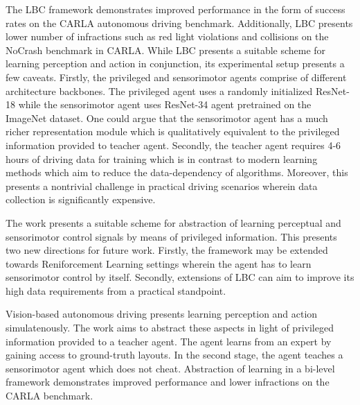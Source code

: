 \documentclass[11pt,letterpaper]{article}
\begin{document}
The LBC framework demonstrates improved performance in the form of success rates on the CARLA autonomous driving benchmark. Additionally, LBC presents lower number of infractions such as red light violations and collisions on the NoCrash benchmark in CARLA. While LBC presents a suitable scheme for learning perception and action in conjunction, its experimental setup presents a few caveats. Firstly, the privileged and sensorimotor agents comprise of different architecture backbones. The privileged agent uses a randomly initialized ResNet-18 while the sensorimotor agent uses ResNet-34 agent pretrained on the ImageNet dataset. One could argue that the sensorimotor agent has a much richer representation module which is qualitatively equivalent to the privileged information provided to teacher agent. Secondly, the teacher agent requires 4-6 hours of driving data for training which is in contrast to modern learning methods which aim to reduce the data-dependency of algorithms. Moreover, this presents a nontrivial challenge in practical driving scenarios wherein data collection is significantly expensive. 

The work presents a suitable scheme for abstraction of learning perceptual and sensorimotor control signals by means of privileged information. This presents two new directions for future work. Firstly, the framework may be extended towards Reniforcement Learning settings wherein the agent has to learn sensorimotor control by itself. Secondly, extensions of LBC can aim to improve its high data requirements from a practical standpoint. 

Vision-based autonomous driving presents learning perception and action simulatenously. The work aims to abstract these aspects in light of privileged information provided to a teacher agent. The agent learns from an expert by gaining access to ground-truth layouts. In the second stage, the agent teaches a sensorimotor agent which does not cheat. Abstraction of learning in a bi-level framework demonstrates improved performance and lower infractions on the CARLA benchmark. 
\end{document}
